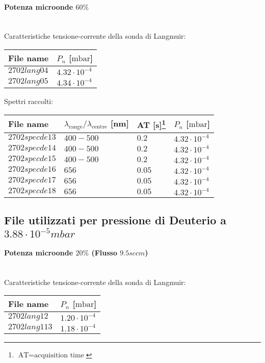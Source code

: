 \paragraph*{Potenza microonde $\text{60\%}$} ~\\
Caratteristiche tensione-corrente della sonda di Langmuir:
\begin{center}
\begin{tabular}{p{3cm}p{3cm}}
\toprule
File name	&$P_n$ [$\si{\milli\bar}$]\\
\midrule
$2702lang04$	&$4.32\cdot10^{-4}$\\
$2702lang05$	&$4.34\cdot10^{-4}$\\
\bottomrule
\end{tabular}
\end{center}

Spettri raccolti:
\begin{center}
\begin{tabular}{p{3cm}p{4cm}p{2cm}p{3cm}}
\toprule
File name	&$\lambda_\text{range}\text{/}\lambda_\text{centre}$ [nm] 	&AT [s]\footnote{$\text{AT}=\text{acquisition time}$} &$P_n$ [$\si{\milli\bar}$]\\
\midrule
$2702specde13$	&$400-500$	&$0.2$		&$4.32\cdot10^{-4}$\\
$2702specde14$	&$400-500$	&$0.2$		&$4.32\cdot10^{-4}$\\
$2702specde15$	&$400-500$	&$0.2$		&$4.32\cdot10^{-4}$\\
$2702specde16$	&$656$		&$0.05$		&$4.32\cdot10^{-4}$\\
$2702specde17$	&$656$		&$0.05$		&$4.32\cdot10^{-4}$\\
$2702specde18$	&$656$		&$0.05$		&$4.32\cdot10^{-4}$\\
\bottomrule
\end{tabular}
\end{center}



\subsection{File utilizzati per pressione di Deuterio a $3.88\cdot10^{-5}mbar$}

\paragraph*{Potenza microonde $\text{20\%}$ (Flusso $9.5sccm$) }~\\
Caratteristiche tensione-corrente della sonda di Langmuir:
\begin{center}
\begin{tabular}{p{3cm}p{3cm}}
\toprule
File name	&$P_{n}$ [$\si{\milli\bar}$]\\
\midrule
$2702lang12$	&$1.20\cdot10^{-4}$\\
$2702lang113$	&$1.18\cdot10^{-4}$\\
\bottomrule
\end{tabular}
\end{center}

